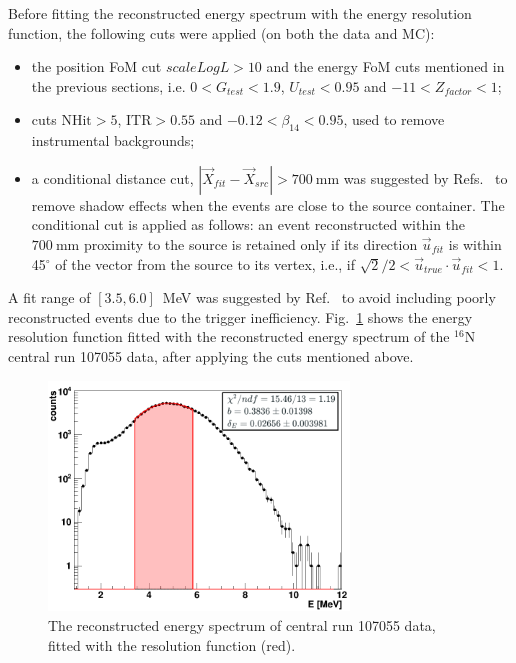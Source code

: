 Before fitting the reconstructed energy spectrum with the energy resolution function, the following cuts were applied (on both the data and MC): 

\begin{itemize}
\item the position FoM cut $scaleLogL>10$ and the energy FoM cuts mentioned in the previous sections, i.e. $0<G_{test}<1.9$, $U_{test}<0.95$ and $-11<Z_{factor}<1$;

\item cuts $\mathrm{NHit}>5$, $\mathrm{ITR}>0.55$ and $-0.12<\beta_{14}<0.95$, used to remove instrumental backgrounds;

\item a conditional distance cut, $|\vec{X}_{fit}-\vec{X}_{src}|>700~$mm was suggested by Refs.~\cite{waterunidoc,leta} to remove shadow effects when the events are close to the source container. The conditional cut is applied as follows: an event reconstructed within the $700~ \mathrm{mm}$ proximity to the source is retained only if its direction $\vec{u}_{fit}$ is within 45$^\circ$ of the vector from the source to its vertex, i.e., if $\sqrt2/2<\vec{u}_{true}\cdot \vec{u}_{fit}<1$.
\end{itemize}

A fit range of $[3.5, 6.0]$~MeV was suggested by Ref.~\cite{waterunidoc} to avoid including poorly reconstructed events due to the trigger inefficiency. Fig.~\ref{fittedEnergyResol} shows the energy resolution function fitted with the reconstructed energy spectrum of the $^{16}$N central run 107055 data, after applying the cuts mentioned above.
\begin{figure}
	\centering
	\includegraphics[width=8cm]{N16data_energy_fitted_107055.png}
	\caption[The reconstructed energy spectrum fitted with resolution function.]{The reconstructed energy spectrum of central run 107055 data, fitted with the resolution function (red).\label{fittedEnergyResol}}
\end{figure}

